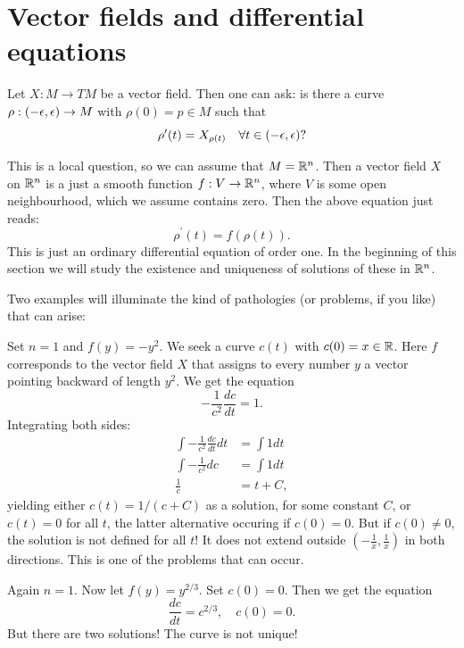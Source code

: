 \documentclass[11pt, english]{article}
\begin{document}
\newpage
\section{Vector fields and differential equations}
Let $X: M \to TM$ be a vector field. Then one can ask: is there a curve $\rho:(-\epsilon,\epsilon) \to M$ with $\rho(0)=p \in M$ such that
\[
\rho^\prime(t) = X_{\rho(t)} \quad \forall t \in (-\epsilon,\epsilon) ?
\]

This is a local question, so we can assume that $M=\mathbb{R}^n$. Then a vector field $X$ on $\mathbb{R}^n$ is a just a smooth function $f:V\to \mathbb{R}^n$, where $V$ is some open neighbourhood, which we assume contains zero. Then the above equation just reads:
\[
\rho^\prime(t) = f(\rho(t)).
\]
This is just an ordinary differential equation of order one. In the beginning of this section we will study the existence and uniqueness of solutions of these in $\mathbb{R}^n$.

Two examples will illuminate the kind of pathologies (or problems, if you like) that can arise:

\begin{example}
Set $n=1$ and $f(y)=-y^2$. We seek a curve $c(t)$ with $c(0)=x \in \mathbb{R}$. Here $f$ corresponds to the vector field $X$ that assigns to every number $y$ a vector pointing backward of length $y^2$. We get the equation
\[
-\frac{1}{c^2} \frac{d c}{d t}= 1.
\]
Integrating both sides:
\begin{align*}
\int -\frac{1}{c^2} \frac{dc}{dt} dt &= \int 1 dt \\
\int -\frac{1}{c^2} dc &= \int 1 dt \\
\frac{1}{c} &=t + C,
\end{align*}
yielding either $c(t)=1/(c+C)$ as a solution, for some constant $C$, or $c(t)=0$ for all $t$, the latter alternative occuring if $c(0)=0$. But if $c(0) \neq 0$, the solution is not defined for all $t$! It does not extend outside $(-\frac{1}{x},\frac{1}{x})$ in both directions. This is one of the problems that can occur.
\end{example}

\begin{example}
Again $n=1$. Now let $f(y)=y^{2/3}$.  Set $c(0)=0$. Then we get the equation
\[
\frac{dc}{dt} = c^{2/3}, \quad c(0)=0.
\]
But there are two solutions! The curve is not unique!
\end{example}
\end{document}
